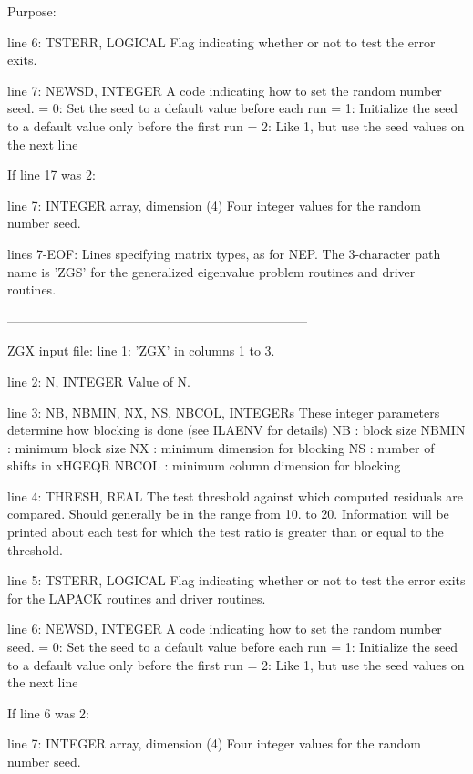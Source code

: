 \begin{DoxyParagraph}{Purpose\+: }
\begin{DoxyVerb}
 line 6:  TSTERR, LOGICAL
          Flag indicating whether or not to test the error exits.

 line 7:  NEWSD, INTEGER
          A code indicating how to set the random number seed.
          = 0:  Set the seed to a default value before each run
          = 1:  Initialize the seed to a default value only before the
                first run
          = 2:  Like 1, but use the seed values on the next line

 If line 17 was 2:

 line 7:  INTEGER array, dimension (4)
          Four integer values for the random number seed.

 lines 7-EOF:  Lines specifying matrix types, as for NEP.
          The 3-character path name is 'ZGS' for the generalized
          eigenvalue problem routines and driver routines.

-----------------------------------------------------------------------

 ZGX input file:
 line 1:  'ZGX' in columns 1 to 3.

 line 2:  N, INTEGER
          Value of N.

 line 3:  NB, NBMIN, NX, NS, NBCOL, INTEGERs
          These integer parameters determine how blocking is done
          (see ILAENV for details)
          NB     : block size
          NBMIN  : minimum block size
          NX     : minimum dimension for blocking
          NS     : number of shifts in xHGEQR
          NBCOL  : minimum column dimension for blocking

 line 4:  THRESH, REAL
          The test threshold against which computed residuals are
          compared. Should generally be in the range from 10. to 20.
          Information will be printed about each test for which the
          test ratio is greater than or equal to the threshold.

 line 5:  TSTERR, LOGICAL
          Flag indicating whether or not to test the error exits for
          the LAPACK routines and driver routines.

 line 6:  NEWSD, INTEGER
          A code indicating how to set the random number seed.
          = 0:  Set the seed to a default value before each run
          = 1:  Initialize the seed to a default value only before the
                first run
          = 2:  Like 1, but use the seed values on the next line

 If line 6 was 2:

 line 7: INTEGER array, dimension (4)
          Four integer values for the random number seed.


\end{DoxyVerb}
\end{DoxyParagraph}
